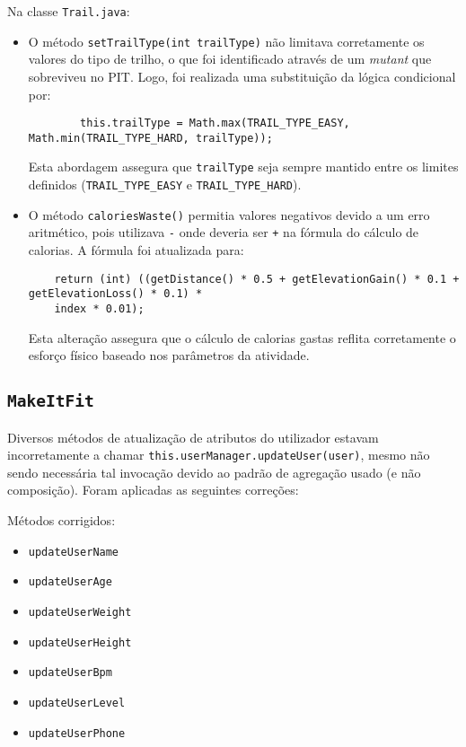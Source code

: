 \documentclass[12pt, a4paper]{article}
\begin{document}
Na classe \texttt{Trail.java}:
\begin{itemize}
  \item O método \texttt{setTrailType(int trailType)} não limitava corretamente os valores do tipo
  de trilho, o que foi identificado através de um \emph{mutant} que sobreviveu no PIT. Logo, foi
  realizada uma substituição da lógica condicional por:
  \begin{verbatim}
        this.trailType = Math.max(TRAIL_TYPE_EASY, Math.min(TRAIL_TYPE_HARD, trailType));
  \end{verbatim}
  Esta abordagem assegura que \texttt{trailType} seja sempre mantido entre os limites definidos
  (\texttt{TRAIL\_TYPE\_EASY} e \texttt{TRAIL\_TYPE\_HARD}).

  \item O método \texttt{caloriesWaste()} permitia valores negativos devido a um erro aritmético,
  pois utilizava \texttt{-} onde deveria ser \texttt{+} na fórmula do cálculo de calorias. A fórmula
  foi atualizada para:
  \begin{verbatim}
    return (int) ((getDistance() * 0.5 + getElevationGain() * 0.1 + getElevationLoss() * 0.1) *
    index * 0.01);
  \end{verbatim}
  Esta alteração assegura que o cálculo de calorias gastas reflita corretamente o esforço físico
  baseado nos parâmetros da atividade.
\end{itemize}

\subsection{\texttt{MakeItFit}}

Diversos métodos de atualização de atributos do utilizador estavam incorretamente a chamar
\texttt{this.userManager.updateUser(user)}, mesmo não sendo necessária tal invocação devido ao
padrão de agregação usado (e não composição). Foram aplicadas as seguintes correções:

Métodos corrigidos:
\begin{itemize}
    \item \texttt{updateUserName}
    \item \texttt{updateUserAge}
    \item \texttt{updateUserWeight}
    \item \texttt{updateUserHeight}
    \item \texttt{updateUserBpm}
    \item \texttt{updateUserLevel}
    \item \texttt{updateUserPhone}
\end{itemize}
\end{document}

